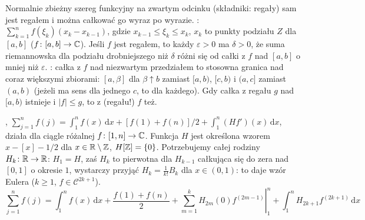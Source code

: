 Normalnie  zbieżny szereg funkcyjny na zwartym odcinku (składniki: regały) sam jest regałem i można całkować go wyraz po wyrazie.
:  $\sum_{k=1}^n f(\xi_k) (x_k - x_{k-1})$, gdzie $x_{k-1} \le \xi_k \le x_k$, $x_k$ to punkty  podziału $Z$ dla $[a,b]$ ($f \colon [a,b]\to \mathbb{C}$).
Jeśli $f$ jest regałem, to każdy $\varepsilon > 0$ ma $\delta > 0$, że suma riemannowska dla podziału drobniejszego niż $\delta$ różni się od całki z $f$ nad $[a,b]$ o mniej niż $\varepsilon$.
: całka z $f$ nad niezwartym przedziałem to stosowna granica nad coraz większymi zbiorami: $[a, \beta]$ dla $\beta \uparrow b$ zamiast $[a, b)$, $[c, b)$ i $(a, c]$ zamiast $(a,b)$ (jeżeli ma sens dla jednego $c$, to dla każdego).
Gdy całka z regału $g$ nad $[a, b)$ istnieje i $|f| \le g$, to z (regału!) $f$ też.

,  $\sum_{j=1}^n f(j) = \int_1^n f(x) \,\textrm{d} x + [{f(1) + f(n)}]/{2} + \int_1^n (Hf')(x) \,\textrm{d} x$, działa dla ciągle różalnej $f \colon [1, n] \to \mathbb{C}$.
Funkcja $H$ jest określona wzorem $x - [x] - 1/2$ dla $x \in \mathbb{R} \setminus \mathbb{Z}$, $H[\mathbb{Z}] = \{0\}$.
Potrzebujemy całej rodziny $H_k \colon \mathbb{R} \to \mathbb{R}$: $H_1 = H$, zaś $H_k$ to pierwotna dla $H_{k-1}$ całkująca się do zera nad $[0,1]$ o okresie $1$, wystarczy przyjąć $H_k = \frac{1}{k!} B_k$ dla $x \in (0, 1)$: to daje  wzór Eulera ($k \ge 1$, $f \in \mathscr C^{2k+1}$).
\[
	\sum_{j=1}^n f(j) = \int_1^n f(x) \,\textrm{d} x + \frac{f(1) + f(n)}{2} + \left. \sum_{m=1}^k H_{2m}(0) f^{(2m-1)} \right|_1^n + \int_1^n H_{2k+1} f^{(2k+1)} \,\textrm{d} x
\]
